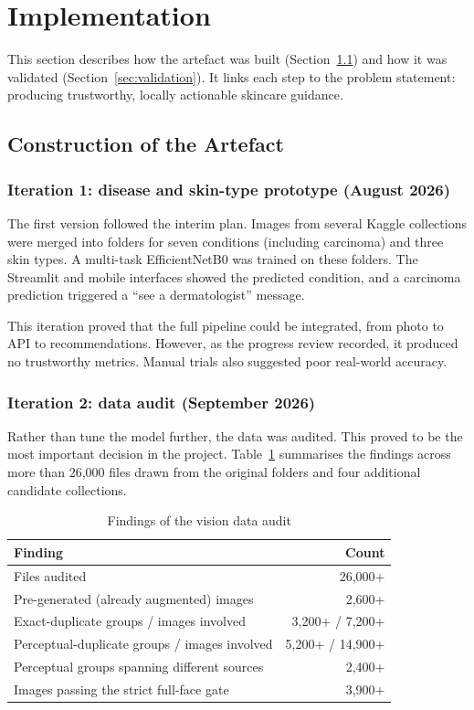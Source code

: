 \section{Implementation}
\label{sec:impl}

This section describes how the artefact was built (Section~\ref{sec:construction}) and how it was validated (Section~\ref{sec:validation}). It links each step to the problem statement: producing trustworthy, locally actionable skincare guidance.

\subsection{Construction of the Artefact}
\label{sec:construction}

\subsubsection*{Iteration 1: disease and skin-type prototype (August 2026)}

The first version followed the interim plan. Images from several Kaggle collections were merged into folders for seven conditions (including carcinoma) and three skin types. A multi-task EfficientNetB0 was trained on these folders. The Streamlit and mobile interfaces showed the predicted condition, and a carcinoma prediction triggered a ``see a dermatologist'' message.

This iteration proved that the full pipeline could be integrated, from photo to API to recommendations. However, as the progress review recorded, it produced no trustworthy metrics. Manual trials also suggested poor real-world accuracy.

\subsubsection*{Iteration 2: data audit (September 2026)}

Rather than tune the model further, the data was audited. This proved to be the most important decision in the project. Table~\ref{tab:audit} summarises the findings across more than 26,000 files drawn from the original folders and four additional candidate collections.

\begin{table}[ht]
\centering\small
\caption{Findings of the vision data audit}
\label{tab:audit}
\begin{tabular}{lr}
\toprule
\textbf{Finding} & \textbf{Count}\\
\midrule
Files audited & 26,000+\\
Pre-generated (already augmented) images & 2,600+\\
Exact-duplicate groups / images involved & 3,200+ / 7,200+\\
Perceptual-duplicate groups / images involved & 5,200+ / 14,900+\\
Perceptual groups spanning different sources & 2,400+\\
Images passing the strict full-face gate & 3,900+\\
\bottomrule
\end{tabular}
\end{table}


